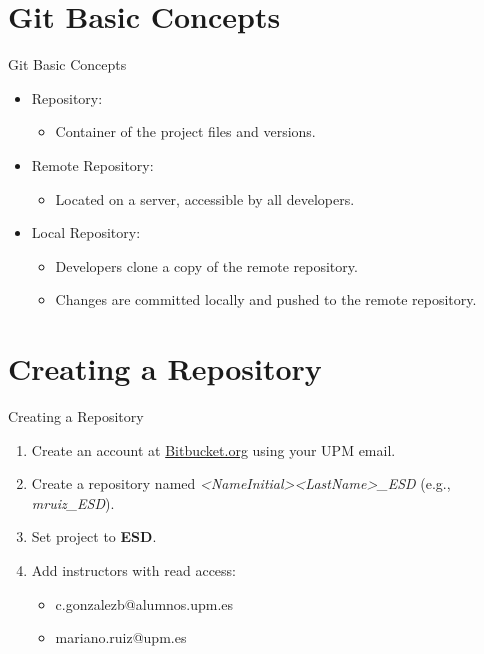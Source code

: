 \section{Git Basic Concepts}
\begin{frame}{Git Basic Concepts}
  \begin{itemize}
    \item Repository:
    \begin{itemize}
      \item Container of the project files and versions.
    \end{itemize}
    \item Remote Repository:
    \begin{itemize}
      \item Located on a server, accessible by all developers.
    \end{itemize}
    \item Local Repository:
    \begin{itemize}
      \item Developers clone a copy of the remote repository.
      \item Changes are committed locally and pushed to the remote repository.
    \end{itemize}
  \end{itemize}
\end{frame}

\section{Creating a Repository}
\begin{frame}{Creating a Repository}
  \begin{enumerate}
    \item Create an account at \href{https://bitbucket.org}{Bitbucket.org} using your UPM email.
    \item Create a repository named \textit{<NameInitial><LastName>\_ESD} (e.g., \textit{mruiz\_ESD}).
    \item Set project to \textbf{ESD}.
    \item Add instructors with read access:
    \begin{itemize}
      \item c.gonzalezb@alumnos.upm.es
      \item mariano.ruiz@upm.es
    \end{itemize}
  \end{enumerate}
\end{frame}

